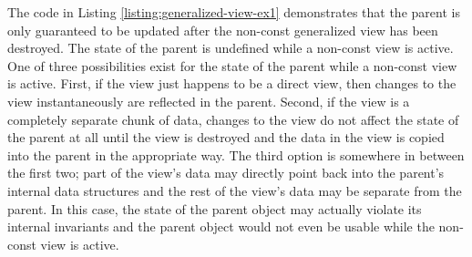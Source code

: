 \documentclass[pdf,ps2pdf,11pt]{SANDreport}
\begin{document}
The code in Listing {}\ref{listing:generalized-view-ex1} demonstrates
that the parent is only guaranteed to be updated after the non-const
generalized view has been destroyed.  The state of the parent is
undefined while a non-const view is active.  One of three
possibilities exist for the state of the parent while a non-const view
is active.  First, if the view just happens to be a direct view, then
changes to the view instantaneously are reflected in the parent.
Second, if the view is a completely separate chunk of data, changes to
the view do not affect the state of the parent at all until the view
is destroyed and the data in the view is copied into the parent in the
appropriate way.  The third option is somewhere in between the first
two; part of the view's data may directly point back into the parent's
internal data structures and the rest of the view's data may be
separate from the parent.  In this case, the state of the parent
object may actually violate its internal invariants and the parent
object would not even be usable while the non-const view is active.
\end{document}
